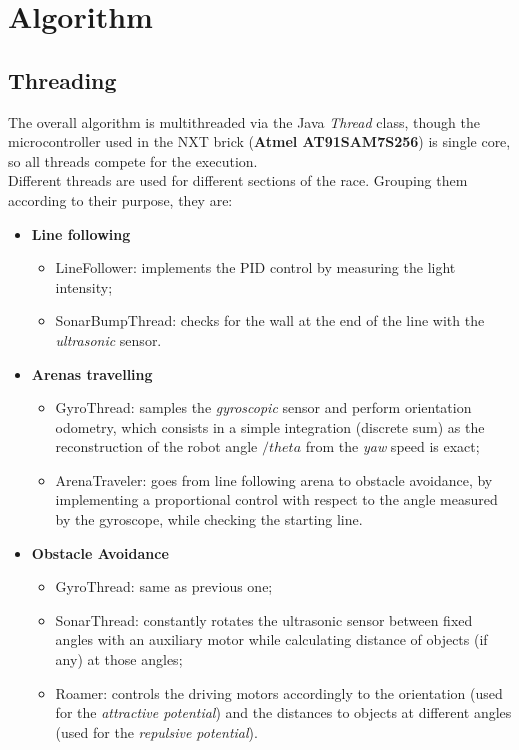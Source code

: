 \documentclass[a4paper,11pt,oneside]{book}
\begin{document}
		
		
		\section{Algorithm}
		\subsection {Threading}
		
		The overall algorithm is multithreaded via the Java \textit{Thread} class, though the microcontroller used in the NXT brick (\textbf{Atmel AT91SAM7S256}) is single core, so all threads compete for the execution.\\
		
		Different threads are used for different sections of the race. Grouping them according to their purpose, they are:
		
		\begin{itemize}
			\item \textbf{Line following}
				\begin{itemize}
						\item LineFollower: implements the PID control by measuring the light intensity;
					\item SonarBumpThread: checks for the wall at the end of the line with the \textit{ultrasonic} sensor.
				\end{itemize}
			
			\item \textbf{Arenas travelling}
			\begin{itemize}
					\item GyroThread: samples the \textit{gyroscopic} sensor and perform orientation odometry, which consists in a simple integration (discrete sum) as the reconstruction of the robot angle $/theta$ from the \textit{yaw} speed is exact;
				\item ArenaTraveler: goes from line following arena to obstacle avoidance, by implementing a proportional control with respect to the angle measured by the gyroscope, while checking the starting line.
			\end{itemize}
		
			
			\item \textbf{Obstacle Avoidance}
			\begin{itemize}
				\item GyroThread: same as previous one;
				\item SonarThread: constantly rotates the ultrasonic sensor between fixed angles with an auxiliary motor while calculating distance of objects (if any) at those angles;
				\item Roamer: controls the driving motors accordingly to the orientation (used for the \textit{attractive potential}) and the distances to objects at different angles (used for the \textit{repulsive potential}).
			\end{itemize}
			
		\end{itemize}
		\vspace{7mm}
		
\end{document}
